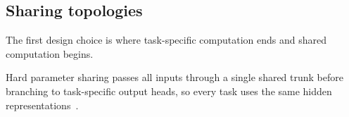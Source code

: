\subsection{Sharing topologies}

The first design choice is where task-specific computation ends and shared
computation begins.

\begin{definition}\label{def:fund:hard}
    Hard parameter sharing passes all inputs through a single shared trunk before
    branching to task-specific output heads, so every task uses the same hidden
    representations~\cite{ruder2017mtloverview}.
\end{definition}

